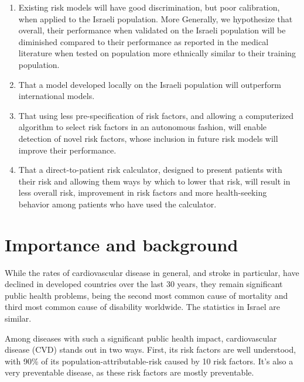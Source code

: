 \documentclass[a4paper,12pt]{article}
\begin{document}
\begin{description}
\begin{enumerate}
			\item Existing risk models will have good discrimination, but poor calibration, when applied to the Israeli population. More Generally, we hypothesize that overall, their performance when validated on the Israeli population will be diminished compared to their performance as reported in the medical literature when tested on population more ethnically similar to their training population.
			
			\item That a model developed locally on the Israeli population will outperform international models.
			
			\item That using less pre-specification of risk factors, and allowing a computerized algorithm to select risk factors in an autonomous fashion, will enable detection of novel risk factors, whose inclusion in future risk models will improve their performance.
			
			\item That a direct-to-patient risk calculator, designed to present patients with their risk and allowing them ways by which to lower that risk, will result in less overall risk, improvement in risk factors and more health-seeking behavior among patients who have used the calculator.
			
		\end{enumerate}
		
	\end{description}
	
	\section{Importance and background}
	
	While the rates of cardiovascular disease in general, and stroke in particular, have declined in developed countries over the last 30 years\cite{Koton2014,Vangen-Loenne2017}, they remain significant public health problems, being the second most common cause of mortality and third most common cause of disability worldwide\cite{Lozano2012}. The statistics in Israel are similar\cite{ICDC2017}.
	
	Among diseases with such a significant public health impact, cardiovascular disease (CVD) stands out in two ways. First, its risk factors are well understood, with 90\% of its population-attributable-risk caused by 10 risk factors. It's also a very preventable disease, as these risk factors are mostly preventable\cite{Yusuf2004,ODonnell2016}.
	
\end{document}
